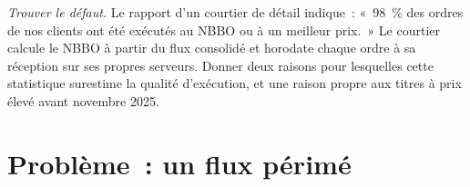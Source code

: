 \begin{exercise}[$\star\star\star$]\label{exo:m1:us-equity-market-structure:8}
\emph{Trouver le défaut.} Le rapport d'un courtier de détail indique~: «~98~\% des ordres de nos clients
ont été exécutés au NBBO ou à un meilleur prix.~» Le courtier calcule le
NBBO à partir du flux consolidé et horodate chaque ordre à sa réception sur ses propres serveurs.
Donner deux raisons pour lesquelles cette statistique surestime la qualité d'exécution, et une
raison propre aux titres à prix élevé avant novembre 2025.
\end{exercise}

\section{Problème~: un flux périmé}

